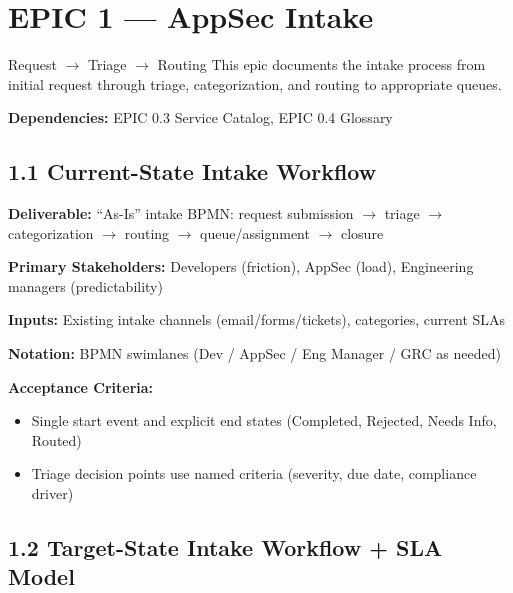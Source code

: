 \documentclass[11pt,letterpaper]{article}
\newcommand{\storyfield}[2]{\textbf{#1:} #2}
\begin{document}
\newpage

\section{EPIC 1 --- AppSec Intake}

\begin{epicbox}{Request $\rightarrow$ Triage $\rightarrow$ Routing}
This epic documents the intake process from initial request through triage, categorization, and routing to appropriate queues.

\textbf{Dependencies:} EPIC 0.3 Service Catalog, EPIC 0.4 Glossary
\end{epicbox}

\subsection{1.1 Current-State Intake Workflow}

\begin{storycard}
\storyfield{Deliverable}{``As-Is'' intake BPMN: request submission $\rightarrow$ triage $\rightarrow$ categorization $\rightarrow$ routing $\rightarrow$ queue/assignment $\rightarrow$ closure}

\storyfield{Primary Stakeholders}{Developers (friction), AppSec (load), Engineering managers (predictability)}

\storyfield{Inputs}{Existing intake channels (email/forms/tickets), categories, current SLAs}

\storyfield{Notation}{BPMN swimlanes (Dev / AppSec / Eng Manager / GRC as needed)}

\storyfield{Acceptance Criteria}{}
\begin{itemize}[nosep, leftmargin=1.5em]
    \item Single start event and explicit end states (Completed, Rejected, Needs Info, Routed)
    \item Triage decision points use named criteria (severity, due date, compliance driver)
\end{itemize}
\end{storycard}

\subsection{1.2 Target-State Intake Workflow + SLA Model}
\end{document}

